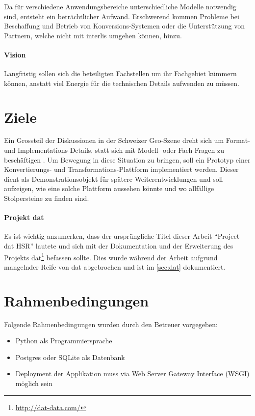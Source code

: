 Da für verschiedene Anwendungsbereiche unterschiedliche Modelle notwendig sind, entsteht ein beträchtlicher Aufwand. Erschwerend kommen Probleme bei Beschaffung und Betrieb von Konversions-Systemen oder die Unterstützung von Partnern, welche nicht mit \gls{interlis} umgehen können, hinzu.

\paragraph{Vision}
Langfristig sollen sich die beteiligten Fachstellen um ihr Fachgebiet kümmern können, anstatt viel Energie für die technischen Details aufwenden zu müssen. 

\section{Ziele}
Ein Grossteil der Diskussionen in der Schweizer Geo-Szene dreht sich um Format- und Implementations-Details, statt sich mit Modell- oder Fach-Fragen zu beschäftigen \cite{sfkeller}. Um Bewegung in diese Situation zu bringen, soll ein Prototyp einer Konvertierungs- und Transformations-Plattform implementiert werden. Dieser dient als Demonstrationsobjekt für spätere Weiterentwicklungen und soll aufzeigen, wie eine solche Plattform aussehen könnte und wo allfällige Stolpersteine zu finden sind.

\paragraph{Projekt dat}
Es ist wichtig anzumerken, dass der ursprüngliche Titel dieser Arbeit ``Project dat HSR'' lautete und sich mit der Dokumentation und der Erweiterung des Projekts dat\footnote{\url{http://dat-data.com/}} befassen sollte. Dies wurde während der Arbeit aufgrund mangelnder Reife von \gls{dat} abgebrochen und ist im \vref{sec:dat} dokumentiert.

\section{Rahmenbedingungen}

Folgende Rahmenbedingungen wurden durch den Betreuer \cite{sfkeller} vorgegeben:

\begin{itemize}
\item Python als Programmiersprache
\item Postgres oder SQLite als Datenbank
\item Deployment der Applikation muss via Web Server Gateway Interface (WSGI) möglich sein
\end{itemize}

